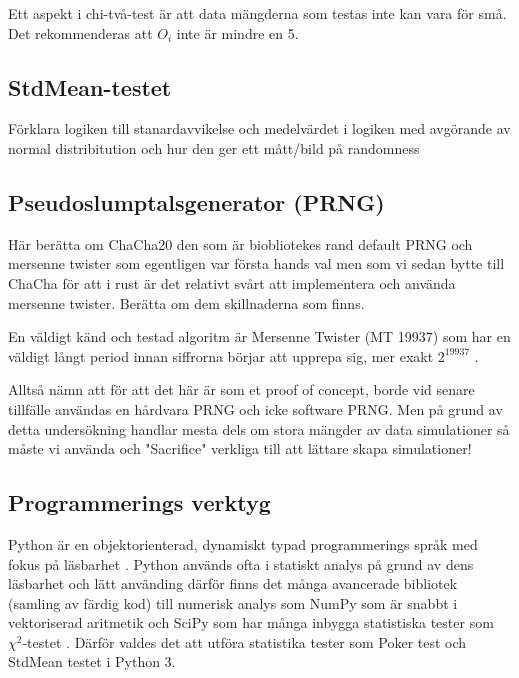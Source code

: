 \documentclass[swedish,a4paper]{article}
\begin{document}
Ett aspekt i chi-två-test är att data mängderna som testas inte kan vara för små. Det rekommenderas att $O_i$ inte är mindre en 5.

\subsection{StdMean-testet}
Förklara logiken till stanardavvikelse och medelvärdet
i logiken med avgörande av normal distribitution och hur den ger ett mått/bild på randomness

\subsection{Pseudoslumptalsgenerator (PRNG)}
Här berätta om ChaCha20 \parencite{chacha} den som är biobliotekes rand
\parencite{rand_crate} default PRNG och mersenne twister som egentligen var första
hands val
\parencite{mersenne_twister} men som vi sedan bytte till ChaCha för att i rust
är det relativt svårt att  implementera och använda mersenne twister. Berätta om
dem skillnaderna som finns.


En väldigt känd och testad algoritm är Mersenne Twister (MT 19937) som
har en väldigt långt period innan siffrorna börjar att upprepa sig, mer
exakt $2^{19937}$ \parencite{mersenne_twister}.

Alltså nämn att för att det här är som et proof of concept, borde vid
senare tillfälle användas en hårdvara PRNG och icke software PRNG.
Men på grund av detta undersökning handlar mesta dels om stora mängder av data
simulationer så måste vi använda och "Sacrifice" verkliga till att lättare
skapa simulationer!
\subsection{Programmerings verktyg}
Python är en objektorienterad, dynamiskt typad
programmerings språk med fokus på
läsbarhet \parencite{python}. Python används ofta i statiskt analys på
grund av dens läsbarhet och lätt använding därför finns det många
avancerade bibliotek (samling av färdig kod) till numerisk analys som
NumPy som är snabbt i vektoriserad aritmetik och SciPy som har många
inbygga statistiska tester som $\chi^2$-testet \parencite{numpy, scipy}.
Därför valdes det att utföra statistika tester som Poker test och
StdMean testet i Python 3.
\end{document}
